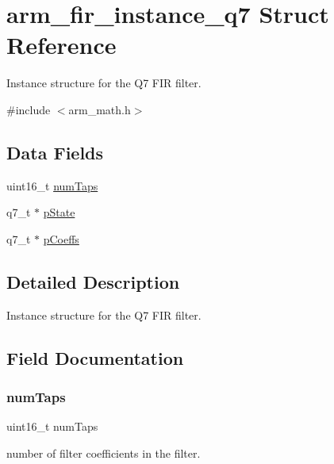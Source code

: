 \hypertarget{structarm__fir__instance__q7}{}\section{arm\+\_\+fir\+\_\+instance\+\_\+q7 Struct Reference}
\label{structarm__fir__instance__q7}


Instance structure for the Q7 F\+IR filter.  




{\ttfamily \#include $<$arm\+\_\+math.\+h$>$}

\subsection*{Data Fields}
\begin{DoxyCompactItemize}
\item 
uint16\+\_\+t \hyperlink{structarm__fir__instance__q7_a751941891e47f522a7f5375fe8990aac}{num\+Taps}
\item 
q7\+\_\+t $\ast$ \hyperlink{structarm__fir__instance__q7_aa8f67102521b620af6f259afdcf29785}{p\+State}
\item 
q7\+\_\+t $\ast$ \hyperlink{structarm__fir__instance__q7_a54407554b4fe7bbbb43924e4eea45e7f}{p\+Coeffs}
\end{DoxyCompactItemize}


\subsection{Detailed Description}
Instance structure for the Q7 F\+IR filter. 

\subsection{Field Documentation}
\mbox{\label{structarm__fir__instance__q7_a751941891e47f522a7f5375fe8990aac}} 
\subsubsection{\texorpdfstring{num\+Taps}{numTaps}}
{\footnotesize\ttfamily uint16\+\_\+t num\+Taps}

number of filter coefficients in the filter. \mbox{\label{structarm__fir__instance__q7_a54407554b4fe7bbbb43924e4eea45e7f}} 
